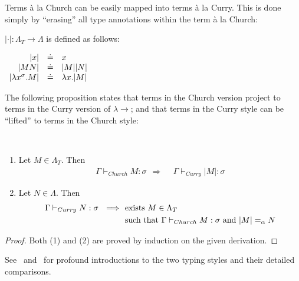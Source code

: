 Terms \`{a} la Church can be easily mapped into terms \`{a} la Curry. This is done simply by ``erasing'' all type annotations within the term \`{a} la Church:
\begin{definition} $| \cdot |: \Lambda_T \rightarrow \Lambda$ is defined as follows:
\begin{center}
$
\begin{array}{rcl}
|x|& \doteq & x \\
|MN|& \doteq & |M||N| \\
|\lambda x^{\sigma}.M|& \doteq & \lambda x.|M|
\end{array}
$
\end{center}
\end{definition}
The following proposition states that terms in the Church version project to terms in the Curry version of $\lambda\!\rightarrow$; and that terms in the Curry style can be ``lifted'' to terms in the Church style:
\begin{proposition}  
\ 
\begin{enumerate}
\item Let $M \in \Lambda_T$. Then
\begin{align*}
\Gamma \vdash_{Church} M:\sigma  \ \ \Longrightarrow \ \ & \Gamma \vdash_{Curry} |M|:\sigma
\end{align*}
\item Let $N\in \Lambda$. Then
\begin{align*}
\Gamma \vdash_{Curry} N:\sigma  \ \  \Longrightarrow \ \ & \text{exists } M  \in \Lambda_T  \\
& \text{such that }  \Gamma \vdash_{Church}  M:\sigma \text{ and } |M| =_{\alpha} N
\end{align*}
\end{enumerate}
\end{proposition}
\begin{proof} Both (1) and (2) are proved by induction on the given derivation.
\end{proof}
See~\cite{Barendregt:1992:Lambda-Calculi-with-Types}  and~\cite{HindleySeldin:2008:Lambda-Calculus-and-Combinators-an-Introduction} for profound introductions to the two typing styles and their detailed comparisons.